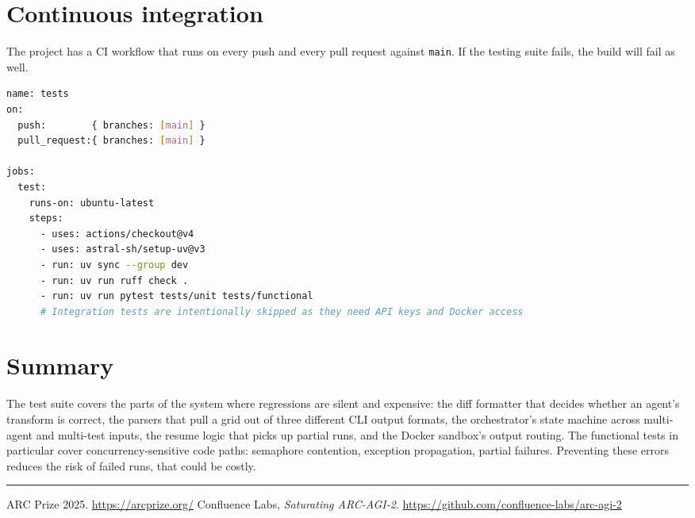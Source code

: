 \documentclass[11pt,a4paper]{article}
\begin{document}
\section{Continuous integration}

The project has a CI workflow that runs on every push and every pull request against \texttt{main}. If the testing suite fails, the build will fail as well.

\begin{lstlisting}[language=bash,caption={\texttt{.github/workflows/tests.yml} (abbreviated).}]
name: tests
on:
  push:        { branches: [main] }
  pull_request:{ branches: [main] }

jobs:
  test:
    runs-on: ubuntu-latest
    steps:
      - uses: actions/checkout@v4
      - uses: astral-sh/setup-uv@v3
      - run: uv sync --group dev
      - run: uv run ruff check .
      - run: uv run pytest tests/unit tests/functional
      # Integration tests are intentionally skipped as they need API keys and Docker access
\end{lstlisting}

\section{Summary}

The test suite covers the parts of the system where regressions are silent and expensive: the diff formatter that decides whether an agent's transform is correct, the parsers that pull a grid out of three different CLI output formats, the orchestrator's state machine across multi-agent and multi-test inputs, the resume logic that picks up partial runs, and the Docker sandbox's output routing. The functional tests in particular cover concurrency-sensitive code paths: semaphore contention, exception propagation, partial failures. Preventing these errors reduces the risk of failed runs, that could be costly.

\bigskip
\hrule
\bigskip

\begin{thebibliography}{9}
   ARC Prize 2025. \url{https://arcprize.org/}
   Confluence Labs, \emph{Saturating ARC-AGI-2}. \url{https://github.com/confluence-labs/arc-agi-2}
\end{thebibliography}
\end{document}
